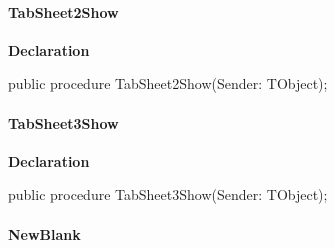 \documentclass{report}
\newif\ifpdf
\begin{document}
\paragraph*{TabSheet2Show}\hspace*{\fill}

\label{editor.TFrmEditor-TabSheet2Show}
\begin{list}{}{
\setlength{\itemindent}{0cm}
\setlength{\listparindent}{0cm}
\setlength{\leftmargin}{\evensidemargin}
\addtolength{\leftmargin}{\tmplength}
\settowidth{\labelsep}{X}
\addtolength{\leftmargin}{\labelsep}
\setlength{\labelwidth}{\tmplength}
}
\item[\textbf{Declaration}\hfill]
\ifpdf
\begin{flushleft}
\fi
\begin{ttfamily}
public procedure TabSheet2Show(Sender: TObject);\end{ttfamily}

\ifpdf
\end{flushleft}
\fi

\end{list}
\paragraph*{TabSheet3Show}\hspace*{\fill}

\label{editor.TFrmEditor-TabSheet3Show}
\begin{list}{}{
\setlength{\itemindent}{0cm}
\setlength{\listparindent}{0cm}
\setlength{\leftmargin}{\evensidemargin}
\addtolength{\leftmargin}{\tmplength}
\settowidth{\labelsep}{X}
\addtolength{\leftmargin}{\labelsep}
\setlength{\labelwidth}{\tmplength}
}
\item[\textbf{Declaration}\hfill]
\ifpdf
\begin{flushleft}
\fi
\begin{ttfamily}
public procedure TabSheet3Show(Sender: TObject);\end{ttfamily}

\ifpdf
\end{flushleft}
\fi

\end{list}
\paragraph*{NewBlank}\hspace*{\fill}
\end{document}
